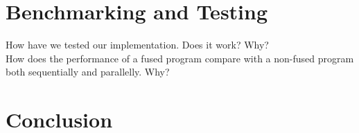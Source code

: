 \documentclass[11pt]{article}
\begin{document}
\section{Benchmarking and Testing}
How have we tested our implementation. Does it work? Why?\\
How does the performance of a fused program compare with a non-fused program both sequentially and parallelly. Why?

\section{Conclusion}
\newpage



\end{document}
